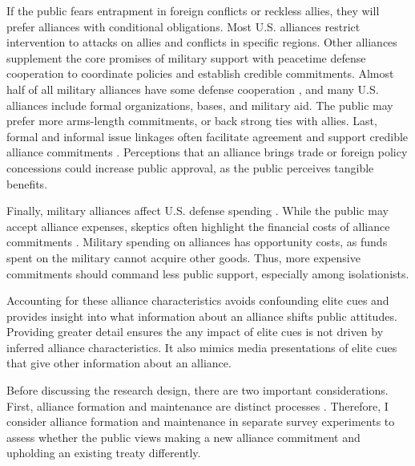 \documentclass[12pt]{article}
\begin{document}
If the public fears entrapment in foreign conflicts or reckless allies, they will prefer alliances with conditional obligations.
Most U.S. alliances restrict intervention to attacks on allies and conflicts in specific regions. 
Other alliances supplement the core promises of military support with peacetime defense cooperation \citep{Morrow1994, LeedsAnac2005} to coordinate policies and establish credible commitments.
Almost half of all military alliances have some defense cooperation \citep{Leedsetal2002}, and many U.S. alliances include formal organizations, bases, and military aid. 
The public may prefer more arms-length commitments, or back strong ties with allies. 
Last, formal and informal issue linkages often facilitate agreement and support credible alliance commitments \citep{Poast2012, Poast2013}. 
Perceptions that an alliance brings trade or foreign policy concessions could increase public approval, as the public perceives tangible benefits.  


Finally, military alliances affect U.S. defense spending \citep{AlleyFuhrmann2021}. 
While the public may accept alliance expenses, skeptics often highlight the financial costs of alliance commitments \citep{Posen2014}. 
Military spending on alliances has opportunity costs, as funds spent on the military cannot acquire other goods. 
Thus, more expensive commitments should command less public support, especially among isolationists. 

 
Accounting for these alliance characteristics avoids confounding elite cues and provides insight into what information about an alliance shifts public attitudes. 
Providing greater detail ensures the any impact of elite cues is not driven by inferred alliance characteristics.
It also mimics media presentations of elite cues that give other information about an alliance. 


Before discussing the research design, there are two important considerations. 
First, alliance formation and maintenance are distinct processes \citep{Snyder1997}. 
Therefore, I consider alliance formation and maintenance in separate survey experiments to assess whether the public views making a new alliance commitment and upholding an existing treaty differently. 
\end{document}
